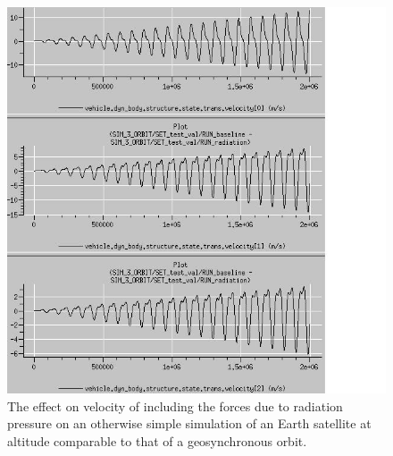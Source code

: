 \begin{description}
     \begin{figure}[!ht]
     \begin{center}
     \includegraphics[width=160mm]{figs/orbital/orbit_delv.jpg}
     \caption{The effect on velocity of including the forces due to radiation pressure
     on an otherwise simple simulation of an Earth satellite
     at altitude comparable to that of a geosynchronous orbit.}
     \label{fig:ivv_orbit_delv}
     \end{center}
     \end{figure}


\end{description}
